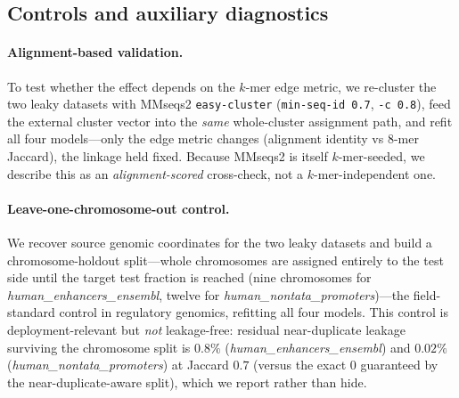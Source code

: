 \documentclass[webpdf,modern,large,namedate]{oup-authoring-template}%
\begin{document}
\subsection{Controls and auxiliary diagnostics}\label{sec:m-controls}
\paragraph{Alignment-based validation.}
To test whether the effect depends on the $k$-mer edge metric, we re-cluster the two leaky datasets with MMseqs2 \citep{steinegger2017mmseqs2} \texttt{easy-cluster} (\texttt{min-seq-id 0.7}, \texttt{-c 0.8}), feed the external cluster vector into the \emph{same} whole-cluster assignment path, and refit all four models---only the edge metric changes (alignment identity vs $8$-mer Jaccard), the linkage held fixed. Because MMseqs2 is itself $k$-mer-seeded, we describe this as an \emph{alignment-scored} cross-check, not a $k$-mer-independent one.

\paragraph{Leave-one-chromosome-out control.}
We recover source genomic coordinates for the two leaky datasets and build a chromosome-holdout split---whole chromosomes are assigned entirely to the test side until the target test fraction is reached (nine chromosomes for \textit{human\_enhancers\_ensembl}, twelve for \textit{human\_nontata\_promoters})---the field-standard control in regulatory genomics, refitting all four models. This control is deployment-relevant but \emph{not} leakage-free: residual near-duplicate leakage surviving the chromosome split is $0.8\%$ (\textit{human\_enhancers\_ensembl}) and $0.02\%$ (\textit{human\_nontata\_promoters}) at Jaccard $0.7$ (versus the exact $0$ guaranteed by the near-duplicate-aware split), which we report rather than hide.
\end{document}
